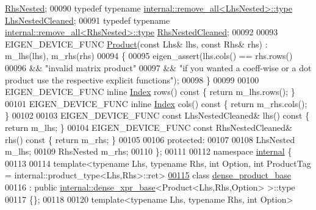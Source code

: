 \begin{DoxyCode}
      \hyperlink{class_eigen_1_1internal_1_1_tensor_lazy_evaluator_writable}{RhsNested};
00090     \textcolor{keyword}{typedef} \textcolor{keyword}{typename} \hyperlink{group___sparse_core___module}{internal::remove\_all<LhsNested>::type} 
      \hyperlink{group___sparse_core___module}{LhsNestedCleaned};
00091     \textcolor{keyword}{typedef} \textcolor{keyword}{typename} \hyperlink{group___sparse_core___module}{internal::remove\_all<RhsNested>::type} 
      \hyperlink{group___sparse_core___module}{RhsNestedCleaned};
00092 
00093     EIGEN\_DEVICE\_FUNC \hyperlink{group___core___module_class_eigen_1_1_product}{Product}(\textcolor{keyword}{const} Lhs& lhs, \textcolor{keyword}{const} Rhs& rhs) : m\_lhs(lhs), m\_rhs(rhs)
00094     \{
00095       eigen\_assert(lhs.cols() == rhs.rows()
00096         && \textcolor{stringliteral}{"invalid matrix product"}
00097         && \textcolor{stringliteral}{"if you wanted a coeff-wise or a dot product use the respective explicit functions"});
00098     \}
00099 
00100     EIGEN\_DEVICE\_FUNC \textcolor{keyword}{inline} \hyperlink{namespace_eigen_a62e77e0933482dafde8fe197d9a2cfde}{Index} rows()\textcolor{keyword}{ const }\{ \textcolor{keywordflow}{return} m\_lhs.rows(); \}
00101     EIGEN\_DEVICE\_FUNC \textcolor{keyword}{inline} \hyperlink{namespace_eigen_a62e77e0933482dafde8fe197d9a2cfde}{Index} cols()\textcolor{keyword}{ const }\{ \textcolor{keywordflow}{return} m\_rhs.cols(); \}
00102 
00103     EIGEN\_DEVICE\_FUNC \textcolor{keyword}{const} LhsNestedCleaned& lhs()\textcolor{keyword}{ const }\{ \textcolor{keywordflow}{return} m\_lhs; \}
00104     EIGEN\_DEVICE\_FUNC \textcolor{keyword}{const} RhsNestedCleaned& rhs()\textcolor{keyword}{ const }\{ \textcolor{keywordflow}{return} m\_rhs; \}
00105 
00106   \textcolor{keyword}{protected}:
00107 
00108     LhsNested m\_lhs;
00109     RhsNested m\_rhs;
00110 \};
00111 
00112 \textcolor{keyword}{namespace }\hyperlink{namespaceinternal}{internal} \{
00113   
00114 template<typename Lhs, typename Rhs, int Option, int ProductTag = internal::product\_type<Lhs,Rhs>::ret>
\hyperlink{class_eigen_1_1internal_1_1dense__product__base}{00115} \textcolor{keyword}{class }\hyperlink{class_eigen_1_1internal_1_1dense__product__base}{dense\_product\_base}
00116  : \textcolor{keyword}{public} \hyperlink{struct_eigen_1_1internal_1_1dense__xpr__base}{internal::dense\_xpr\_base}<Product<Lhs,Rhs,Option> >::type
00117 \{\};
00118 
00120 \textcolor{keyword}{template}<\textcolor{keyword}{typename} Lhs, \textcolor{keyword}{typename} Rhs, \textcolor{keywordtype}{int} Option>

\end{DoxyCode}
